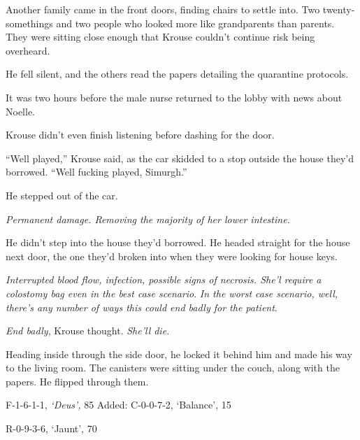 Another family came in the front doors, finding chairs to settle into.  Two twenty-somethings and two people who looked more like grandparents than parents.  They were sitting close enough that Krouse couldn't continue risk being overheard.



He fell silent, and the others read the papers detailing the quarantine protocols.



It was two hours before the male nurse returned to the lobby with news about Noelle.



Krouse didn't even finish listening before dashing for the door.



\sectionbreak



``Well played,'' Krouse said, as the car skidded to a stop outside the house they'd borrowed.  ``Well fucking played, Simurgh.''



He stepped out of the car.



\emph{Permanent damage.  Removing the majority of her lower intestine.}



He didn't step into the house they'd borrowed.  He headed straight for the house next door, the one they'd broken into when they were looking for house keys.



\emph{Interrupted blood flow, infection, possible signs of necrosis.  She'l require a colostomy bag even in the best case scenario}.  \emph{In the worst case scenario, well, there's any number of ways this could end badly for the patient}.



\emph{End badly}, Krouse thought.  \emph{She'll die}.



Heading inside through the side door, he locked it behind him and made his way to the living room.  The canisters were sitting under the couch, along with the papers.  He flipped through them.



  F-1-6-1-1, \emph{`Deus', }85%
Added: C-0-0-7-2, `Balance', 15%



 R-0-9-3-6, `Jaunt', 70%



